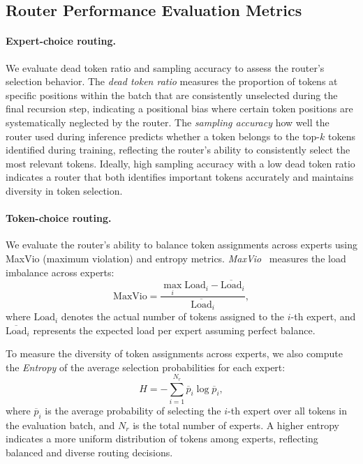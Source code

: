 \subsection{Router Performance Evaluation Metrics}


\paragraph{Expert-choice routing.}
We evaluate dead token ratio and sampling accuracy to assess the router’s selection behavior. The \textit{dead token ratio} measures the proportion of tokens at specific positions within the batch that are consistently unselected during the final recursion step, indicating a positional bias where certain token positions are systematically neglected by the router. The \textit{sampling accuracy} how well the router used during inference predicts whether a token belongs to the top-$k$ tokens identified during training, reflecting the router’s ability to consistently select the most relevant tokens.
Ideally, high sampling accuracy with a low dead token ratio indicates a router that both identifies important tokens accurately and maintains diversity in token selection.


\vspace{-10pt}
\paragraph{Token-choice routing.}
We evaluate the router’s ability to balance token assignments across experts using MaxVio (maximum violation) and entropy metrics. \textit{MaxVio}~\citep{wang2024auxiliary} measures the load imbalance across experts:
\begin{equation*}
\mathrm{MaxVio} = \frac{\max_i \mathrm{Load}_i - \overline{\mathrm{Load}}_i}{\overline{\mathrm{Load}}_i},
\label{eq:maxvio}
\end{equation*}
where $\mathrm{Load}_i$ denotes the actual number of tokens assigned to the $i$-th expert, and $\overline{\mathrm{Load}}_i$ represents the expected load per expert assuming perfect balance.

To measure the diversity of token assignments across experts, we also compute the \textit{Entropy} of the average selection probabilities for each expert:
\begin{equation*}
H = - \sum_{i=1}^{N_r} \overline{p}_i \log \overline{p}_i,
\label{eq:entropy}
\end{equation*}
where $\overline{p}_i$ is the average probability of selecting the $i$-th expert over all tokens in the evaluation batch, and $N_r$ is the total number of experts. A higher entropy indicates a more uniform distribution of tokens among experts, reflecting balanced and diverse routing decisions.




